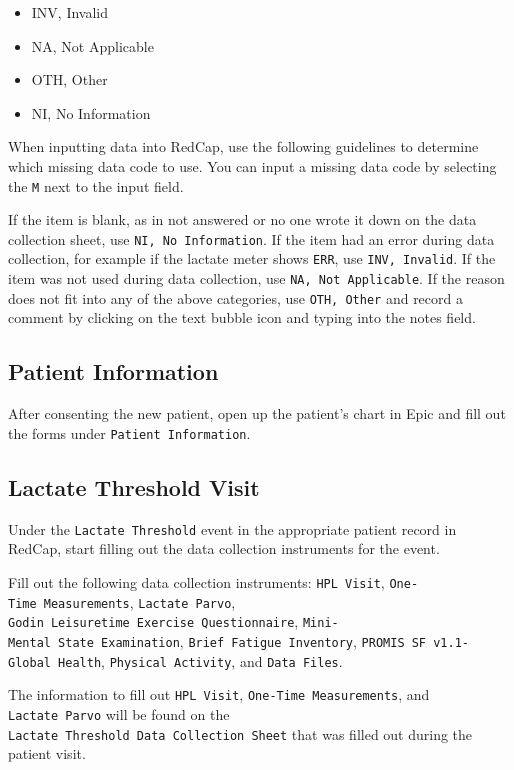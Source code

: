 \documentclass[
]{book}
\providecommand{\tightlist}{%
  \setlength{\itemsep}{0pt}\setlength{\parskip}{0pt}}
\begin{document}
\begin{itemize}
\tightlist
\item
  INV, Invalid
\item
  NA, Not Applicable
\item
  OTH, Other
\item
  NI, No Information
\end{itemize}

When inputting data into RedCap, use the following guidelines to determine which missing data code to use. You can input a missing data code by selecting the \texttt{M} next to the input field.

If the item is blank, as in not answered or no one wrote it down on the data collection sheet, use \texttt{NI,\ No\ Information}. If the item had an error during data collection, for example if the lactate meter shows \texttt{ERR}, use \texttt{INV,\ Invalid}. If the item was not used during data collection, use \texttt{NA,\ Not\ Applicable}. If the reason does not fit into any of the above categories, use \texttt{OTH,\ Other} and record a comment by clicking on the text bubble icon and typing into the notes field.

\hypertarget{patient-information}{%
\subsection{Patient Information}\label{patient-information}}

After consenting the new patient, open up the patient's chart in Epic and fill out the forms under \texttt{Patient\ Information}.

\hypertarget{lactate-threshold-visit}{%
\subsection{Lactate Threshold Visit}\label{lactate-threshold-visit}}

Under the \texttt{Lactate\ Threshold} event in the appropriate patient record in RedCap, start filling out the data collection instruments for the event.

Fill out the following data collection instruments: \texttt{HPL\ Visit}, \texttt{One-Time\ Measurements}, \texttt{Lactate\ Parvo}, \texttt{Godin\ Leisuretime\ Exercise\ Questionnaire}, \texttt{Mini-Mental\ State\ Examination}, \texttt{Brief\ Fatigue\ Inventory}, \texttt{PROMIS\ SF\ v1.1-Global\ Health}, \texttt{Physical\ Activity}, and \texttt{Data\ Files}.

The information to fill out \texttt{HPL\ Visit}, \texttt{One-Time\ Measurements}, and \texttt{Lactate\ Parvo} will be found on the \texttt{Lactate\ Threshold\ Data\ Collection\ Sheet} that was filled out during the patient visit.
\end{document}
